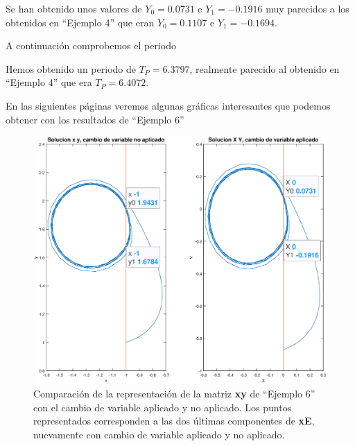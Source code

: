 \documentclass[12pt,a4paper]{report} %
\begin{document}
	\vspace{1cm}
	
	\vspace{1cm}\noindent Se han obtenido unos valores de $Y_0=0.0731$ e $Y_1=-0.1916$ muy parecidos a los obtenidos en ``Ejemplo 4'' que eran $Y_0=0.1107$ e $Y_1=-0.1694$.
	
	\newpage
	
	\vspace{0.5cm}A continuación comprobemos el periodo
	
	\vspace{1cm}
	
	\vspace{1cm}\noindent Hemos obtenido un periodo de $T_P=6.3797$, realmente parecido al obtenido en ``Ejemplo 4'' que era $T_P=6.4072$.
	
    \vspace{1cm}En las siguientes páginas veremos algunas gráficas interesantes que podemos obtener con los resultados de ``Ejemplo 6''
    
    \newpage
    
    	\begin{figure}[h]
    	\centering
    	\includegraphics[width=1\textwidth]{g1ejem6.eps}
    	\caption{Comparación de la representación de la matriz \textbf{xy} de ``Ejemplo 6'' con el cambio de variable aplicado y no aplicado. Los puntos representados corresponden a las dos últimas componentes de \textbf{xE}, nuevamente con cambio de variable aplicado y no aplicado.}
    	\label{fig:g1ejem6}
    \end{figure}\smallskip
    
\end{document}
